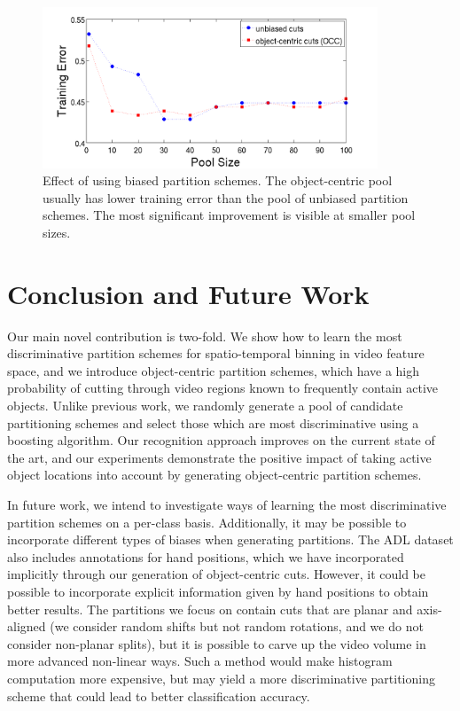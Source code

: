 \documentclass[12pt]{article} %
\begin{document}
  \begin{figure}[t]
		\begin{center}
			  \includegraphics[width=10cm]{figures/trainerror.png}
		\end{center}
		   \caption{Effect of using biased partition schemes. The object-centric
         pool
       usually has lower training error
       than the pool of unbiased partition schemes. The most significant
     improvement is visible at smaller pool sizes.}
				\label{fig:trainerror}
	\end{figure}
  
	
\section{Conclusion and Future Work}
	Our main novel contribution is two-fold. We show how to learn the most
  discriminative partition schemes for spatio-temporal binning in video feature space, and
  we introduce object-centric partition schemes, which have a high
  probability of cutting through video regions known to frequently contain
  active objects. Unlike previous work, we randomly generate a pool of
  candidate partitioning schemes and select those which are most
  discriminative using a boosting algorithm.
  Our recognition approach improves on the current state of the art, and our
  experiments demonstrate the positive impact of taking active object
  locations into account by generating object-centric partition schemes.
  
  In future work, we intend to investigate ways of learning the most
  discriminative partition schemes on a per-class basis.
	Additionally, it may be possible to incorporate different types of biases when generating
	partitions. The ADL dataset also includes annotations for hand positions,
	which we have incorporated implicitly through our generation of
  object-centric cuts.
	However,
	it could be possible to incorporate explicit information given by hand
	positions to obtain better results.
	The partitions we focus on contain cuts that are
  planar and axis-aligned (we consider random shifts but not random
  rotations, and we do not consider non-planar splits),
  but it is possible to carve up the
	video volume in more advanced non-linear ways. Such a method would 
  make histogram computation more expensive, but may yield a more discriminative
	partitioning scheme that could lead to better classification accuracy.
\end{document}
